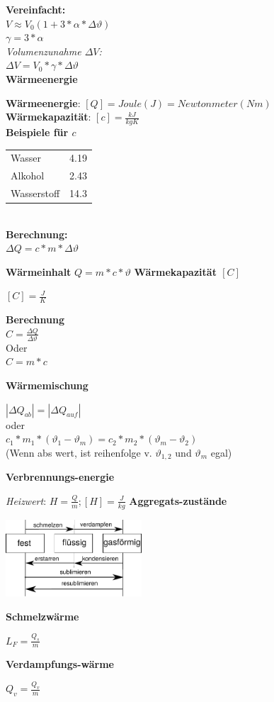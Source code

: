 \documentclass[a4paper,9pt]{article}
\begin{document}
\begin{multicols}{4}
	  \textbf{Vereinfacht:}\\
	  
	  $ V \approx V_0 (1 + 3 * \alpha * \Delta \vartheta) $\\
	  
	  $ \gamma = 3 * \alpha $ \\
	  
	  \textit{Volumenzunahme $\Delta V$:}\\
	  $ \Delta V = V_0 * \gamma  * \Delta \vartheta $ \\
	  
	  \textbf{Wärmeenergie}
	  
	  \textbf{Wärmeenergie}: $[Q] = Joule (J) = Newtonmeter (Nm)$\\
	  \textbf{Wärmekapazität}: $ [c] = \frac{kJ}{kg K}$\\
	  
	  \textbf{Beispiele für $ c $}\\ 
	  \begin{tabular}{ll}
	  	Wasser & 4.19 \\
	  	Alkohol & 2.43 \\
	  	Wasserstoff & 14.3
	  \end{tabular}\\
	  
	  \textbf{Berechnung:}\\
	  $ \Delta Q = c * m * \Delta \vartheta $
	  
	  \textbf{Wärmeinhalt}
	  $ Q = m * c * \vartheta $
	  \textbf{Wärmekapazität $[C]$}
	  
	  $ [C] = \frac{J}{K} $
	  
	  \textbf{Berechnung}\\
	  $ C = \frac{\Delta Q}{\Delta \vartheta} $\\
	  
	  Oder \\
	  
	  $ C = m * c $
	  
	  \textbf{Wärmemischung}
	  
	  $ |\Delta Q_{ab}| = | \Delta Q_{auf} | $\\
	  oder\\
	  $c_1 * m_1  * (\vartheta_1 - \vartheta_m) = c_2 * m_2 * (\vartheta_m - \vartheta_2) $\\
	  (Wenn abs wert, ist reihenfolge v. $ \vartheta_{1,2}$ und $ \vartheta_m $ egal)
	  
	  \textbf{Verbrennungs-energie}
	  
	  \textit{Heizwert}: $ H = \frac{Q}{m}; [H] = \frac{J}{kg} $
	  \textbf{Aggregats-zustände}
	  
	  \includegraphics[width=2in]{agregat}
	  
	  \textbf{Schmelzwärme}
	  
	  $ L_F = \frac{Q_s}{m} $
	  
	  \textbf{Verdampfungs-wärme}
	  
	  $ Q_v = \frac{Q_v}{m} $
	
	
\end{multicols}	
\end{document}
